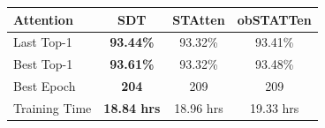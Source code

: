 \documentclass[../main.tex]{subfiles}
\begin{document}
\begin{tabular}{lccc}\toprule

Attention &SDT &STAtten &obSTATTen\\\midrule

Last Top-1	& \textbf{93.44\%}	& 93.32\%	&93.41\%\\
Best Top-1	& \textbf{93.61\%}	& 93.32\%	&93.48\%\\
Best Epoch	& \textbf{204}		& 209		& 209	\\
Training Time & \textbf{18.84 hrs} & 18.96 hrs & 19.33 hrs  \\\bottomrule

\end{tabular}
\end{document}
